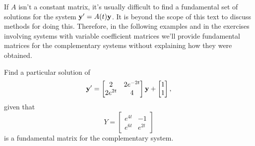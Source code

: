 \documentclass{ximera}
\begin{document}
If $A$ isn't  a constant matrix, it's usually difficult to find a
fundamental set of solutions for the system ${\bf y}'=A(t){\bf y}$. It
is beyond the scope of this text to discuss methods for doing this.
Therefore, in the following examples and in the exercises involving
systems with variable coefficient matrices we'll provide fundamental
matrices for the complementary systems without explaining how they
were obtained.

\begin{example}\label{example:10.7.2} 
Find a particular solution of
\begin{equation} \label{eq:10.7.6}
{\bf y}'=\begin{bmatrix}2&2e^{-2t}\\2e^{2t}&4\end{bmatrix}{\bf y}+\begin{bmatrix}1\\1\end{bmatrix},
\end{equation}
given that
$$
Y=\begin{bmatrix} e^{4t}&-1\\e^{6t}&e^{2t}\end{bmatrix}
$$
is  a fundamental matrix for the complementary system.


\end{example}
\end{document}
